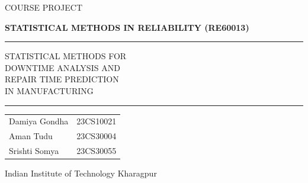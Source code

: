 \begin{titlepage}
    \centering
    \vspace*{3cm}
    
    {\large COURSE PROJECT \par}
    \vspace{0.2cm}
    {\large\bfseries STATISTICAL METHODS IN RELIABILITY (RE60013) \par}
    
    \vspace{2cm}
    
    
    \begin{center}
        \rule{\textwidth}{0.8pt}

        \vspace{0.7cm}


        {\LARGE\bfseries
        \parbox{0.95\textwidth}{\centering
            STATISTICAL METHODS FOR\\[0.2cm]
            DOWNTIME ANALYSIS AND \\[0.2cm]
            REPAIR TIME PREDICTION\\[0.2cm]
            IN MANUFACTURING
        }}

        \vspace{0.7cm}

        \rule{\textwidth}{0.8pt}
    \end{center}

    
    \vspace{3cm}
    
    \begin{center}
        {\large
        \begin{tabular*}{0.38\textwidth}{@{\extracolsep{\fill}}lr@{}}
            Damiya Gondha & 23CS10021 \\[0.25cm]
            Aman Tudu & 23CS30004 \\[0.25cm]
            Srishti Somya & 23CS30055
        \end{tabular*}
        }
    \end{center}
    
    \vspace{1.5cm}
    

    {\large Indian Institute of Technology Kharagpur \par}
    
    \vfill
\end{titlepage}